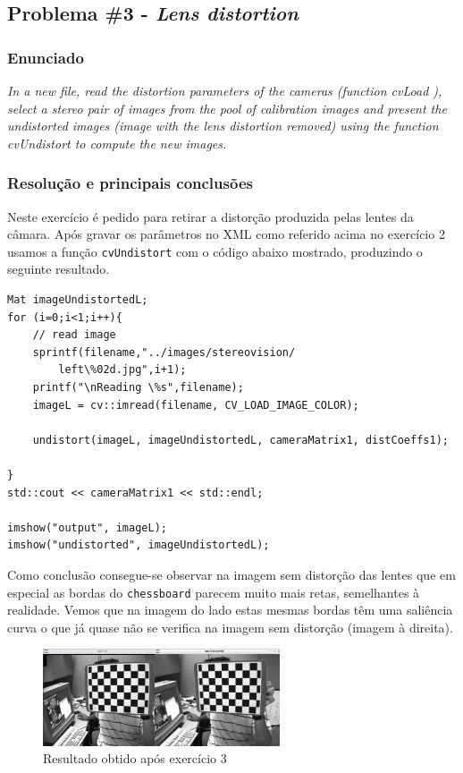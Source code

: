 \documentclass[portuguese, times, mirror]{revdetua}
\begin{document}


\subsection{Problema \#3 - \textit{Lens distortion}}

\subsubsection{Enunciado}
\textit{In a new file, read the distortion parameters of the cameras (function cvLoad ), select a stereo pair of
images from the pool of calibration images and present the undistorted images (image with the lens
distortion removed) using the function cvUndistort to compute the new images.}

\subsubsection{Resolução e principais conclusões}

Neste exercício é pedido para retirar a distorção produzida pelas lentes da câmara. Após gravar os parâmetros no XML como referido acima no exercício 2 usamos a função \texttt{cvUndistort} com o código abaixo mostrado, produzindo o seguinte resultado.

\begin{lstlisting}[caption=Função undistrort,label=code:C]
Mat imageUndistortedL;
for (i=0;i<1;i++){
    // read image
    sprintf(filename,"../images/stereovision/
        left\%02d.jpg",i+1);
    printf("\nReading \%s",filename);
    imageL = cv::imread(filename, CV_LOAD_IMAGE_COLOR);

    undistort(imageL, imageUndistortedL, cameraMatrix1, distCoeffs1);

}
std::cout << cameraMatrix1 << std::endl;

imshow("output", imageL);
imshow("undistorted", imageUndistortedL);
\end{lstlisting}

Como conclusão consegue-se observar na imagem sem distorção das lentes que em especial as bordas do \texttt{chessboard} parecem muito mais retas, semelhantes à realidade. Vemos que na imagem do lado estas mesmas bordas têm uma saliência curva o que já quase não se verifica na imagem sem distorção (imagem à direita).


\begin{figure}[ht!]
\centering
\includegraphics[width=70mm]{img/ex3.png}
\caption{Resultado obtido após exercício 3}
\end{figure}
\end{document}
